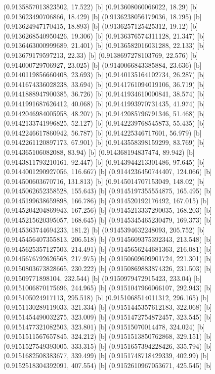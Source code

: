 {{{(0.9135857013823502, 17.522) [b] 
(0.913608060066022, 18.29) [b] 
(0.913623490706866, 18.429) [b] 
(0.9136238056179036, 18.795) [b] 
(0.913624947170415, 18.893) [b] 
(0.9136257125425312, 19.12) [b] 
(0.9136268540950426, 19.306) [b] 
(0.9136376574311128, 21.347) [b] 
(0.9136463000999689, 21.401) [b] 
(0.9136582016031288, 22.133) [b] 
(0.913679179597213, 22.33) [b] 
(0.9138697278103769, 22.576) [b] 
(0.914000729706927, 23.025) [b] 
(0.9140066843385884, 23.636) [b] 
(0.9140119856660408, 23.693) [b] 
(0.9140135164102734, 26.287) [b] 
(0.9141674336028238, 33.694) [b] 
(0.9141761094019106, 36.719) [b] 
(0.9141888947900385, 36.726) [b] 
(0.9141934610000841, 38.574) [b] 
(0.9141991687626412, 40.068) [b] 
(0.9141993970731435, 41.974) [b] 
(0.9142046984005958, 48.207) [b] 
(0.9142085796791346, 51.468) [b] 
(0.9142133741996825, 52.127) [b] 
(0.9142239768545873, 55.435) [b] 
(0.9142246617860942, 56.787) [b] 
(0.914225346717601, 56.979) [b] 
(0.9142261120897173, 67.901) [b] 
(0.9143558398159299, 83.769) [b] 
(0.914365106082088, 83.94) [b] 
(0.914368194837474, 89.942) [b] 
(0.9143811793210161, 92.447) [b] 
(0.9143944213301486, 97.645) [b] 
(0.9144001290927056, 116.667) [b] 
(0.9144236450744407, 124.066) [b] 
(0.914500603670716, 131.813) [b] 
(0.9145014707153049, 148.02) [b] 
(0.9145062652358528, 155.643) [b] 
(0.9145197355554875, 165.495) [b] 
(0.9145199638659898, 166.786) [b] 
(0.914520192176492, 167.015) [b] 
(0.9145204204869943, 167.256) [b] 
(0.9145213337290035, 168.203) [b] 
(0.9145215620395057, 168.645) [b] 
(0.9145345465230479, 169.373) [b] 
(0.9145363744694233, 181.2) [b] 
(0.9145394632248093, 205.752) [b] 
(0.9145456407355813, 206.518) [b] 
(0.9145609375392343, 213.548) [b] 
(0.9145625357127503, 214.491) [b] 
(0.9145656244681363, 216.081) [b] 
(0.9145676792626568, 217.975) [b] 
(0.9150609609901724, 221.301) [b] 
(0.9150803673828665, 230.222) [b] 
(0.9150869883874326, 231.503) [b] 
(0.91509771898104, 232.544) [b] 
(0.9150979472915423, 233.04) [b] 
(0.9151006870175696, 244.965) [b] 
(0.9151047966066107, 292.943) [b] 
(0.915105024917113, 295.518) [b] 
(0.9151068514011312, 296.165) [b] 
(0.9151130289119033, 321.334) [b] 
(0.9151445357612183, 322.068) [b] 
(0.9151454490032275, 323.009) [b] 
(0.9151472754872457, 323.545) [b] 
(0.9151477321082503, 323.801) [b] 
(0.91515070014478, 324.024) [b] 
(0.9151511567657845, 324.212) [b] 
(0.9151513850762868, 329.151) [b] 
(0.9151527549393005, 333.315) [b] 
(0.9151657394228426, 335.794) [b] 
(0.9151682508383677, 339.499) [b] 
(0.9151748718429339, 402.99) [b] 
(0.9152518304392091, 407.554) [b] 
(0.9152610967053671, 425.545) [b] 
}}}
